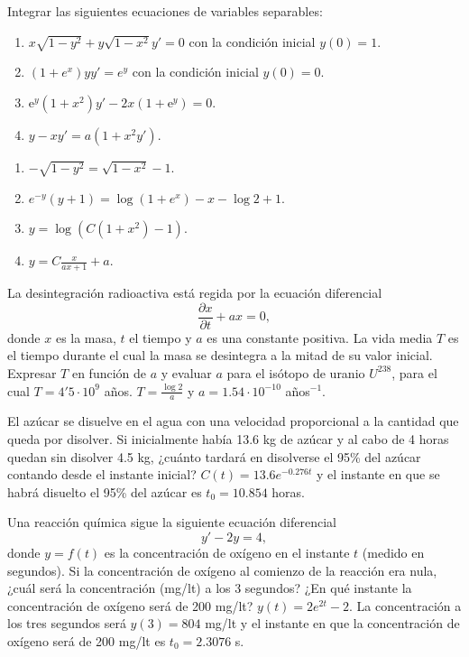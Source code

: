 
{Integrar las siguientes ecuaciones de variables separables:
\begin{enumerate}
\item $x\sqrt{1-y^2}+y\sqrt{1-x^2}y'=0$ con la condición inicial $y(0)=1$.
\item $(1+e^x)yy'=e^y$ con la condición inicial $y(0)=0$.
\item e$^y(1+x^2)y'-2x(1+\mbox{e}^y)=0$.
\item $y-xy'=a(1+x^2y')$.
\end{enumerate}
}
{
\begin{enumerate}
\item $-\sqrt{1-y^2}=\sqrt{1-x^2}-1$.
\item $e^{-y}(y+1)=\log(1+e^x)-x-\log 2+1$.
\item $y=\log(C(1+x^2)-1)$.
\item $y=C\frac{x}{ax+1}+a$.
\end{enumerate}
}
{}


{La desintegración radioactiva está regida por la ecuación
diferencial
\[
\frac{\partial x}{\partial t}+ax=0,
\]
donde $x$ es la masa, $t$ el tiempo y $a$ es una constante positiva. La vida media $T$ es el tiempo durante el cual la
masa se desintegra a la mitad de su valor inicial. Expresar $T$ en función de $a$ y evaluar $a$ para el isótopo de
uranio $U^{238}$, para el cual $T=4'5\cdot10^9$ años. } 
{$T = \frac{\log 2}{a}$ y $a=1.54\cdot 10^{-10}$ años$^{-1}$.
}
{}



{El azúcar se disuelve en el agua con una velocidad proporcional a la cantidad que queda por disolver. Si inicialmente
había 13.6 kg de azúcar y al cabo de 4 horas quedan sin disolver 4.5 kg, ¿cuánto tardará en disolverse el 95\% del
azúcar contando desde el instante inicial? }
{$C(t)= 13.6e^{-0.276 t}$ y el instante en que se habrá disuelto el 95\% del azúcar es $t_0=10.854$ horas.
}
{}



{Una reacción química sigue la siguiente ecuación diferencial
\[
y'-2y=4,
\]
donde $y=f(t)$ es la concentración de oxígeno en el instante $t$ (medido en segundos). Si la concentración de oxígeno
al comienzo de la reacción era nula, ¿cuál será la concentración (mg/lt) a los 3 segundos? ¿En qué instante la
concentración de oxígeno será de 200 mg/lt?}
{$y(t)=2e^{2t}-2$. La concentración a los tres segundos será $y(3)=804$ mg/lt y el instante en que la concentración de
oxígeno será de 200 mg/lt es $t_0=2.3076$ s.}
{}



